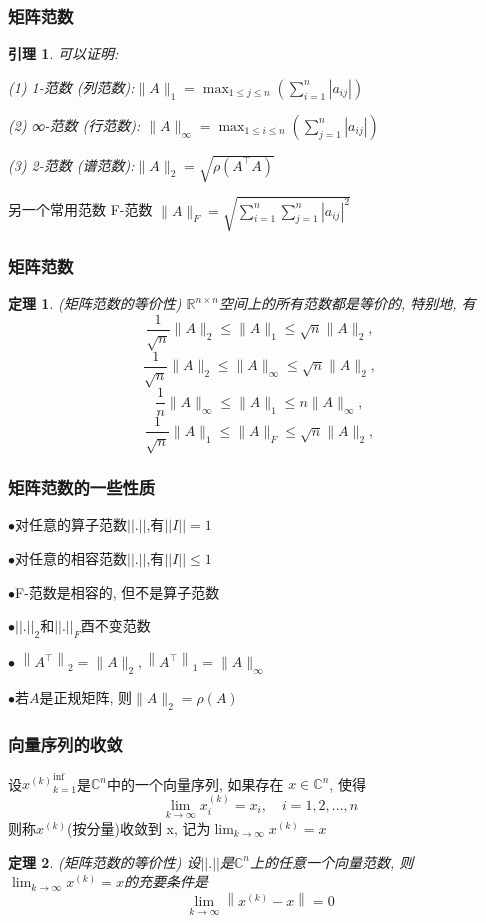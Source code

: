 \documentclass[notheorems,serif]{beamer}
\newcommand{\hei}[1]{{\HEI#1}}
\newtheorem{theorem}{\hei{定理}}
\newtheorem{lemma}{\hei{引理}}
\begin{document}
\begin{frame}
\frametitle{矩阵范数}
\begin{lemma}
	可以证明:
	
	(1) 1-范数 (列范数):$\|A\|_{1}=\max _{1 \leq j \leq n}\left(\sum_{i=1}^{n}\left|a_{i j}\right|\right)$
	
	(2) ∞-范数 (行范数): $\|A\|_{\infty}=\max _{1 \leq i \leq n}\left(\sum_{j=1}^{n}\left|a_{i j}\right|\right)$
	
	(3) 2-范数 (谱范数):$\|A\|_{2}=\sqrt{\rho\left(A^{\top} A\right)}$
	
\end{lemma}

另一个常用范数 F-范数 $\|A\|_{F}=\sqrt{\sum_{i=1}^{n} \sum_{j=1}^{n}\left|a_{i j}\right|^{2}}$
\end{frame}

\begin{frame}
\frametitle{矩阵范数}
\begin{theorem}(矩阵范数的等价性)
	$\mathbb{R}^{n×n}$空间上的所有范数都是等价的, 特别地, 有
	$$
	\frac{1}{\sqrt{n}}\|A\|_{2} \leq\|A\|_{1} \leq \sqrt{n}\|A\|_{2},
	$$
	$$
	\frac{1}{\sqrt{n}}\|A\|_{2} \leq\|A\|_{\infty} \leq \sqrt{n}\|A\|_{2},
	$$
	$$
	\frac{1}{n}\|A\|_{\infty} \leq\|A\|_{1} \leq n\|A\|_{\infty}
	,
	$$
	$$
	\frac{1}{\sqrt{n}}\|A\|_{1} \leq\|A\|_{F} \leq \sqrt{n}\|A\|_{2}
	,
	$$
\end{theorem}
\end{frame}

\begin{frame}
\frametitle{矩阵范数的一些性质}
$\bullet$对任意的算子范数$||.||$,有$||I|| = 1$

$\bullet$对任意的相容范数$||.||$,有$||I|| \leq 1$ 

$\bullet$F-范数是相容的, 但不是算子范数

$\bullet$$||.||_2$和$||.||_F$酉不变范数

$\bullet$ $\left\|A^{\top}\right\|_{2}=\|A\|_{2},\left\|A^{\top}\right\|_{1}=\|A\|_{\infty}$

$\bullet$若$A$是正规矩阵, 则$\|A\|_{2}=\rho(A)$
\end{frame}

\begin{frame}
\frametitle{向量序列的收敛}
设${x^{(k)}}^{\inf}_{
	k=1}$是$\mathbb{C}^n $中的一个向量序列, 如果存在 $x ∈ \mathbb{C}^n$, 使得
$$
\lim _{k \rightarrow \infty} x_{i}^{(k)}=x_{i}, \quad i=1,2, \ldots, n
$$
则称${x^{(k)}}$(按分量)收敛到 x, 记为$\lim _{k \rightarrow \infty} x^{(k)}=x$

\begin{theorem}(矩阵范数的等价性)
	设$||.||$是$\mathbb{C}^{n}$上的任意一个向量范数, 则$\lim _{k \rightarrow \infty} x^{(k)}=x$的充要条件是
	$$
	\lim _{k \rightarrow \infty}\left\|x^{(k)}-x\right\|=0
	$$
\end{theorem}
\end{frame}
\end{document}
